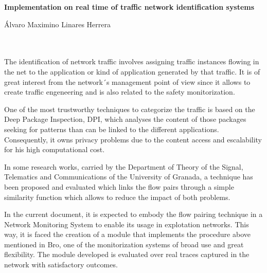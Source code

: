 \thispagestyle{empty}


\begin{center}
{\large\bfseries Implementation on real time of traffic network identification systems}\\
\end{center}
\begin{center}
Álvaro Maximino Linares Herrera\\
\end{center}

\\

\vspace{0.7cm}
\\

The identification of network traffic involves assigning traffic instances flowing in the net to the application or kind of application generated by that traffic. It is of great interest from the network´s management point of view since it allows to create traffic engeneering and is also related to the safety monitorization.

\intro One of the most trustworthy techniques to categorize the traffic is based on the Deep Package Inspection, DPI, which analyses the content of those packages seeking for patterns than can be linked to the different applications. Consequently, it owns privacy problems due to the content access and escalability for his high computational cost.

\intro In some research works, carried by the Department of Theory of the Signal, Telematics and Communications of the University of Granada, a technique has been proposed and evaluated which links the flow pairs through a simple similarity function which allows to reduce the impact of both problems.

\intro In the current document, it is expected to embody the flow pairing technique in a Network Monitoring System to enable its usage in explotation networks. This way, it is faced the creation of a module that implements the procedure above mentioned in Bro, one of the monitorization systems of broad use and great flexibility. The module developed is evaluated over real traces captured in the network with satisfactory outcomes.

\chapter*{}
\thispagestyle{empty}

